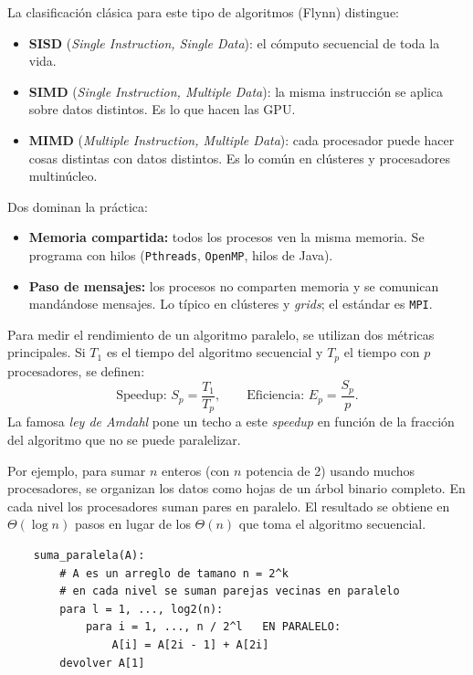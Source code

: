 \documentclass[12pt,letterpaper]{article}
\begin{document}
La clasificación clásica para este tipo de algoritmos (Flynn) distingue:
\begin{itemize}
    \item \textbf{SISD} (\emph{Single Instruction, Single Data}): el cómputo 
    secuencial de toda la vida.
    \item \textbf{SIMD} (\emph{Single Instruction, Multiple Data}): la misma 
    instrucción se aplica sobre datos distintos. Es lo que hacen las GPU.
    \item \textbf{MIMD} (\emph{Multiple Instruction, Multiple Data}): cada 
    procesador puede hacer cosas distintas con datos distintos. Es lo común 
    en clústeres y procesadores multinúcleo.
\end{itemize}

Dos dominan la práctica:
\begin{itemize}
    \item \textbf{Memoria compartida:} todos los procesos ven la misma memoria. 
    Se programa con hilos (\texttt{Pthreads}, \texttt{OpenMP}, hilos de Java).
    \item \textbf{Paso de mensajes:} los procesos no comparten memoria y se 
    comunican mandándose mensajes. Lo típico en clústeres y \emph{grids}; el 
    estándar es \texttt{MPI}.
\end{itemize}

Para medir el rendimiento de un algoritmo paralelo, se utilizan dos métricas 
principales. Si $T_1$ es el tiempo del algoritmo secuencial y $T_p$ el tiempo 
con $p$ procesadores, se definen:
\begin{equation*}
    \text{Speedup: } S_p = \frac{T_1}{T_p}, \qquad \text{Eficiencia: } 
    E_p = \frac{S_p}{p}.
\end{equation*}
La famosa \emph{ley de Amdahl} pone un techo a este \emph{speedup} en función 
de la fracción del algoritmo que no se puede paralelizar.

Por ejemplo, para sumar $n$ enteros (con $n$ potencia de 2) usando muchos 
procesadores, se organizan los datos como hojas de un árbol binario completo. 
En cada nivel los procesadores suman pares en paralelo. El resultado se obtiene 
en $\Theta(\log n)$ pasos en lugar de los $\Theta(n)$ que toma el algoritmo 
secuencial.

\begin{verbatim}
    suma_paralela(A):
        # A es un arreglo de tamano n = 2^k
        # en cada nivel se suman parejas vecinas en paralelo
        para l = 1, ..., log2(n):
            para i = 1, ..., n / 2^l   EN PARALELO:
                A[i] = A[2i - 1] + A[2i]
        devolver A[1]
\end{verbatim}
\end{document}
